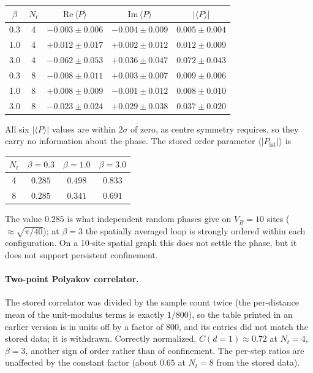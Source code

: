 \documentclass[11pt]{article}
\begin{document}
\begin{center}
\begin{tabular}{ccccc}
\toprule
$\beta$ & $N_t$ & $\mathrm{Re}\,\langle P\rangle$ &
$\mathrm{Im}\,\langle P\rangle$ & $|\langle P\rangle|$ \\
\midrule
0.3 & 4 & $-0.003\pm 0.006$ & $-0.004\pm 0.009$ & $0.005\pm 0.004$ \\
1.0 & 4 & $+0.012\pm 0.017$ & $+0.002\pm 0.012$ & $0.012\pm 0.009$ \\
3.0 & 4 & $-0.062\pm 0.053$ & $+0.036\pm 0.047$ & $0.072\pm 0.043$ \\
0.3 & 8 & $-0.008\pm 0.011$ & $+0.003\pm 0.007$ & $0.009\pm 0.006$ \\
1.0 & 8 & $+0.008\pm 0.009$ & $-0.001\pm 0.012$ & $0.008\pm 0.010$ \\
3.0 & 8 & $-0.023\pm 0.024$ & $+0.029\pm 0.038$ & $0.037\pm 0.020$ \\
\bottomrule
\end{tabular}
\end{center}

All six $|\langle P\rangle|$ values are within $2\sigma$ of zero, as centre
symmetry requires, so they carry no information about the phase.  The
stored order parameter $\langle |P_\text{lat}| \rangle$ is

\begin{center}
\begin{tabular}{cccc}
\toprule
$N_t$ & $\beta = 0.3$ & $\beta = 1.0$ & $\beta = 3.0$ \\
\midrule
4 & $0.285$ & $0.498$ & $0.833$ \\
8 & $0.285$ & $0.341$ & $0.691$ \\
\bottomrule
\end{tabular}
\end{center}

\noindent The value $0.285$ is what independent random phases give on
$V_B = 10$ sites ($\approx\sqrt{\pi/40}$); at $\beta = 3$ the spatially
averaged loop is strongly ordered within each configuration.  On a
10-site spatial graph this does not settle the phase, but it does not
support persistent confinement.

\paragraph{Two-point Polyakov correlator.} The stored correlator was
divided by the sample count twice (the per-distance mean of the unit-modulus
terms is exactly $1/800$), so the table printed in an earlier version is in
units off by a factor of 800, and its entries did not match the stored data;
it is withdrawn.  Correctly normalized, $C(d = 1) \approx 0.72$ at
$N_t = 4$, $\beta = 3$, another sign of order rather than of confinement.
The per-step ratios are unaffected by the constant factor (about $0.65$ at
$N_t = 8$ from the stored data).
\end{document}
